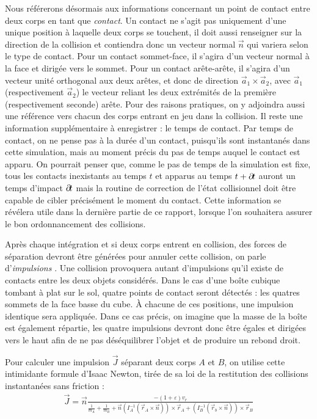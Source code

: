 Nous référerons désormais aux informations concernant un point de
contact entre deux corps en tant que \textit{contact}. Un contact ne
s'agit pas uniquement d'une unique position à laquelle deux corps se
touchent, il doit aussi renseigner sur la direction de la collision et
contiendra donc un vecteur normal $\vec{n}$ qui variera selon le type
de contact. Pour un contact sommet-face, il s'agira d'un vecteur
normal à la face et dirigée vers le sommet. Pour un contact
arête-arête, il s'agira d'un vecteur unité orthogonal aux deux arêtes,
et donc de direction $\vec{a}_1 \times \vec{a}_2$, avec $\vec{a}_1$
(respectivement $\vec{a}_2$) le vecteur reliant les deux extrémités de
la première (respectivement seconde) arête. Pour des raisons
pratiques, on y adjoindra aussi une référence vers chacun des corps
entrant en jeu dans la collision. Il reste une information
supplémentaire à enregistrer : le temps de contact. Par temps de
contact, on ne pense pas à la durée d'un contact, puisqu'ils sont
instantanés dans cette simulation, mais au moment précis du pas de
temps auquel le contact est apparu. On pourrait penser que, comme le
pas de temps de la simulation est fixe, tous les contacts inexistants
au temps $t$ et apparus au temps $t + \partial \! t$ auront un temps
d'impact $\partial \! t$ mais la routine de correction de l'état
collisionnel doit être capable de cibler précisément le moment du
contact. Cette information se révélera utile dans la dernière partie
de ce rapport, lorsque l'on souhaitera assurer le bon ordonnancement
des collisions.

Après chaque intégration et si deux corps entrent en collision, des
forces de séparation devront être générées pour annuler cette
collision, on parle d'\textit{impulsions} \cite{mirtich}. Une
collision provoquera autant d'impulsions qu'il existe de contacts
entre les deux objets considérés. Dans le cas d'une boîte cubique
tombant à plat sur le sol, quatre points de contact seront détectés :
les quatres sommets de la face basse du cube. \`A chacune de ces
positions, une impulsion identique sera appliquée. Dans ce cas précis,
on imagine que la masse de la boîte est également répartie, les
quatre impulsions devront donc être égales et dirigées vers le haut
afin de ne pas déséquilibrer l'objet et de produire un rebond droit.

Pour calculer une impulsion $\vec{J}$ séparant deux corps $A$ et $B$, on
utilise cette intimidante formule d'Isaac Newton, tirée de sa loi de
la restitution des collisions instantanées sans friction :
\begin{align*}
\vec{J} = \vec{n} 
  \frac{-(1 + \varepsilon) v_r}{
  \frac{1}{m_A} +
  \frac{1}{m_B} +
  \vec{n}
  (I_A^{-1} (\vec{r}_A \times \vec{n})) \times \vec{r}_A +
  (I_B^{-1} (\vec{r}_b \times \vec{n})) \times \vec{r}_B
}
\end{align*}


